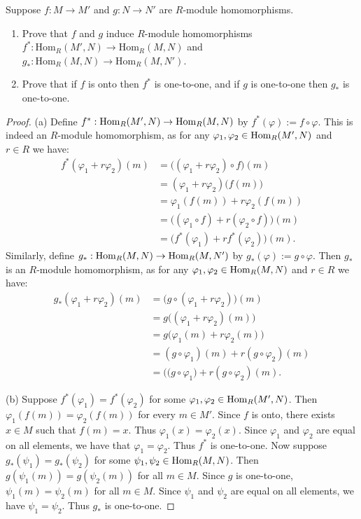 \documentclass[10pt,oneside,openany]{memoir}
\begin{document}
\begin{exercise}
	Suppose $f : M \longrightarrow M'$ and $g : N \longrightarrow N'$ are
$R$-module homomorphisms.
	\mbox{}
	\begin{enumerate}[label = (\alph*),itemsep=1pt,topsep=3pt]
		\item Prove that $f$ and $g$ induce $R$-module homomorphisms $f^* : \mathrm{Hom}_R(M',N) \longrightarrow \mathrm{Hom}_R(M,N)$ and $g_* : \mathrm{Hom}_R(M,N) \longrightarrow \mathrm{Hom}_R(M,N')$.
		\item Prove that if $f$ is onto then $f^*$ is one-to-one, and if $g$ is one-to-one then $g_*$ is one-to-one.
	\end{enumerate}
\end{exercise}
{\color{blue}

	\begin{proof}
		(a) Define $f^\ast:\operatorname{Hom}_R(M',N) \rightarrow \operatorname{Hom}_R(M,N)$ by $f^\ast(\varphi) := f \circ \varphi$. This is indeed an $R$-module homomorphism, as for any $\varphi_1,\varphi_2 \in \operatorname{Hom}_R(M',N)$ and $r \in R$ we have:
		\begin{align*}
			f^\ast(\varphi_1 + r\varphi_2)(m) 
			&= \bigl( (\varphi_1 + r \varphi_2) \circ f \bigr)(m) \\
			&=  (\varphi_1 + r \varphi_2)\bigl( f(m) \bigr)\\
			&= \varphi_1(f(m)) + r \varphi_2(f(m)) \\
			&= \bigl( (\varphi_1 \circ f) + r (\varphi_2 \circ f) \bigr)(m) \\
			&= \bigl( f^\ast(\varphi_1) + r f^\ast(\varphi_2) \bigr)(m).
		\end{align*}
		Similarly, define $g_\ast:\operatorname{Hom}_R(M,N) \rightarrow \operatorname{Hom}_R(M,N')$ by $g_\ast(\varphi):= g \circ \varphi$. Then $g_\ast$ is an $R$-module homomorphism, as for any $\varphi_1,\varphi_2 \in \operatorname{Hom}_R(M,N)$ and $r \in R$ we have:
		\begin{align*}
			g_\ast(\varphi_1 + r \varphi_2)(m)
			&= \bigl( g \circ (\varphi_1 + r \varphi_2) \bigr)(m) \\
			&= g \bigl( (\varphi_1 + r\varphi_2)(m) \bigr) \\
			&= g \bigl( \varphi_1(m) + r \varphi_2(m) \bigr) \\
			&= (g \circ \varphi_1)(m) + r (g \circ \varphi_2)(m) \\
			&= \bigl( (g \circ \varphi_1 \bigr) + r (g \circ \varphi_2)(m).
		\end{align*}

		(b) Suppose $f^\ast(\varphi_1) = f^\ast(\varphi_2)$ for some $\varphi_1,\varphi_2 \in \operatorname{Hom}_R(M',N)$. Then $\varphi_1(f(m)) = \varphi_2(f(m))$ for every $m \in M'$. Since $f$ is onto, there exists $x \in M$ such that $f(m) = x$. Thus $\varphi_1(x) = \varphi_2(x)$. Since $\varphi_1$ and $\varphi_2$ are equal on all elements, we have that $\varphi_1 = \varphi_2$. Thus $f^\ast$ is one-to-one. Now suppose $g_\ast(\psi_1) = g_\ast(\psi_2)$ for some $\psi_1,\psi_2 \in \operatorname{Hom}_R(M,N)$. Then $g(\psi_1(m)) = g(\psi_2(m))$ for all $m \in M$. Since $g$ is one-to-one, $\psi_1(m) = \psi_2(m)$ for all $m \in M$. Since $\psi_1$ and $\psi_2$ are equal on all elements, we have $\psi_1 = \psi_2$. Thus $g_\ast$ is one-to-one.
	\end{proof}
}
\end{document}
